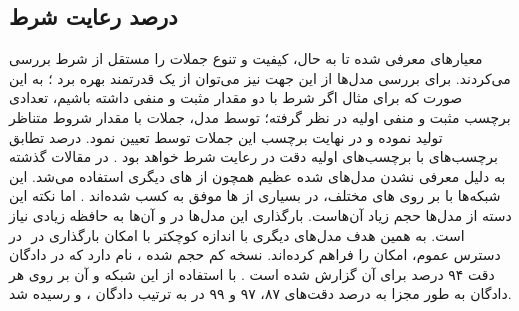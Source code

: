 \subsection{درصد رعایت شرط}
معیارهای معرفی شده تا به حال، کیفیت و تنوع جملات را مستقل از شرط بررسی می‌کردند. برای بررسی مدل‌ها از این جهت نیز می‌توان از یک \classifier{} قدرتمند بهره برد
\cite{toward, sentigan}؛
به این صورت که برای مثال اگر شرط با دو مقدار مثبت و منفی داشته باشیم، تعدادی برچسب مثبت و منفی اولیه در نظر گرفته؛ توسط مدل، جملات با مقدار شروط متناظر تولید نموده و در نهایت برچسب این جملات توسط \classifier{} تعیین نمود. درصد تطابق برچسب‌های \classifier{} با برچسب‌های اولیه دقت در رعایت شرط خواهد بود
\cite{toward, sentigan}.
در مقالات گذشته به دلیل معرفی نشدن مدل‌های \pretrain{} شده عظیم همچون  از \classifier{}های دیگری استفاده می‌شد. این شبکه‌ها با
بر روی \task{}‌های مختلف، در بسیاری از \task{}ها موفق به کسب \stateoftheart{} شده‌اند \cite{bert}. اما نکته این دسته از مدل‌ها حجم زیاد آن‌هاست. بارگذاری  این مدل‌ها در \gpu{} و \finetuning{} آن‌ها به حافظه زیادی نیاز است. به همین هدف مدل‌های دیگری با اندازه کوچکتر با امکان بارگذاری در \gpu{}‌ در دسترس عموم، امکان \finetuning{} را فراهم کرده‌اند. نسخه کم حجم شده ،
نام دارد که در دادگان  دقت ۹۴ درصد برای آن گزارش شده است \cite{distilbert}. با استفاده از این شبکه و \finetuning{} آن بر روی هر دادگان به طور مجزا به درصد دقت‌های ۸۷، ۹۷ و ۹۹ در به ترتیب دادگان \sst{}، \yelp{} و \amazon{} رسیده شد.

